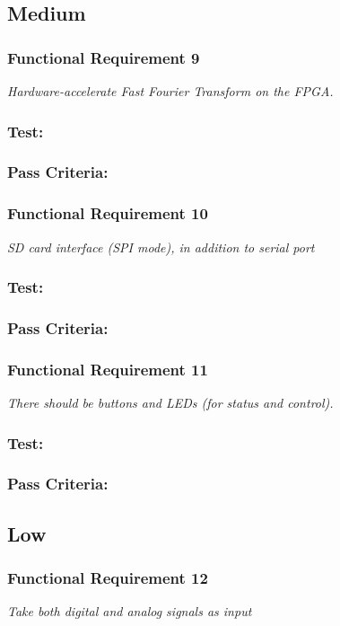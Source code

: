 \subsection{Medium}
\subsubsection*{Functional Requirement 9}
\textit{Hardware-accelerate Fast Fourier Transform on the FPGA.}
\subsubsection*{Test:}
\subsubsection*{Pass Criteria:}

\subsubsection*{Functional Requirement 10}
\textit{SD card interface (SPI mode), in addition to serial port}
\subsubsection*{Test:}
\subsubsection*{Pass Criteria:}

\subsubsection*{Functional Requirement 11}
\textit{There should be buttons and LEDs (for status and control).}
\subsubsection*{Test:}
\subsubsection*{Pass Criteria:}


\subsection{Low}
\subsubsection*{Functional Requirement 12}
\textit{Take both digital and analog signals as input}
